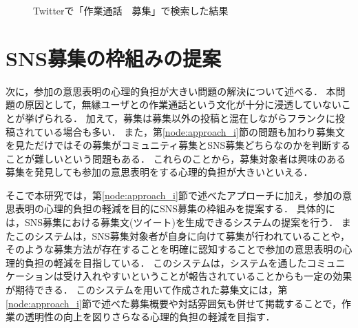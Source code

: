 \begin{figure}
    \centering
    \caption{Twitterで「作業通話　募集」で検索した結果}
    \label{fig:tweet_recruitment}
\end{figure}

\section{SNS募集の枠組みの提案}

次に，参加の意思表明の心理的負担が大きい問題の解決について述べる．
本問題の原因として，無縁ユーザとの作業通話という文化が十分に浸透していないことが挙げられる．
加えて，募集は募集以外の投稿と混在しながらフランクに投稿されている場合も多い．
また，第\ref{node:approach_i}節の問題も加わり募集文を見ただけではその募集がコミュニティ募集とSNS募集どちらなのかを判断することが難しいという問題もある．
これらのことから，募集対象者は興味のある募集を発見しても参加の意思表明をする心理的負担が大きいといえる．

そこで本研究では，第\ref{node:approach_i}節で述べたアプローチに加え，参加の意思表明の心理的負担の軽減を目的にSNS募集の枠組みを提案する．
具体的には，SNS募集における募集文(ツイート)を生成できるシステムの提案を行う．
またこのシステムは，SNS募集対象者が自身に向けて募集が行われていることや，そのような募集方法が存在することを明確に認知することで参加の意思表明の心理的負担の軽減を目指している．
このシステムは，システムを通したコミュニケーションは受け入れやすいということが報告されていることからも一定の効果が期待できる\cite{Harada}\cite{Kimura}\cite{Nishimura}\cite{Tsuzuki}．
このシステムを用いて作成された募集文には，第\ref{node:approach_i}節で述べた募集概要や対話雰囲気も併せて掲載することで，作業の透明性の向上を図りさらなる心理的負担の軽減を目指す．
